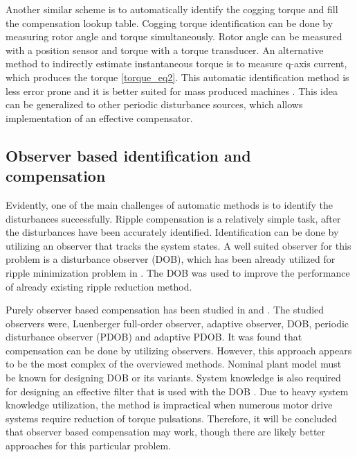 Another similar scheme is to automatically identify the cogging torque and fill the compensation lookup table. Cogging torque identification can be done by measuring rotor angle and torque simultaneously. Rotor angle can be measured with a position sensor and torque with a torque transducer. An alternative method to indirectly estimate instantaneous torque is to measure q-axis current, which produces the torque \eqref{torque_eq2}. This automatic identification method is less error prone and it is better suited for mass produced machines \cite{CTR_SW_ff:2011, CTR_SW:2014, CTR_SW:2019}. This idea can be generalized to other periodic disturbance sources, which allows implementation of an effective compensator.


\subsection{Observer based identification and compensation}
Evidently, one of the main challenges of automatic methods is to identify the disturbances successfully. Ripple compensation is a relatively simple task, after the disturbances have been accurately identified. Identification can be done by utilizing an observer that tracks the system states. A well suited observer for this problem is a disturbance observer (DOB), which has been already utilized for ripple minimization problem in \cite{TRR_SW:2019}. The DOB was used to improve the performance of already existing ripple reduction method.

Purely observer based compensation has been studied in \cite{Observer:2013} and \cite{Observer:2018}. The studied observers were, Luenberger full-order observer, adaptive observer, DOB, periodic disturbance observer (PDOB) and adaptive PDOB. It was found that compensation can be done by utilizing observers. However, this approach appears to be the most complex of the overviewed methods. Nominal plant model must be known for designing DOB or its variants. System knowledge is also required for designing an effective filter that is used with the DOB \cite{Observer:2018}. Due to heavy system knowledge utilization, the method is impractical when numerous motor drive systems require reduction of torque pulsations. Therefore, it will be concluded that observer based compensation may work, though there are likely better approaches for this particular problem.


